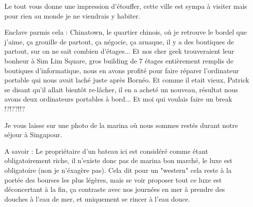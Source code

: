\begin{multicols}{2}
Le tout vous donne une impression d'étouffer, cette ville est sympa à visiter mais pour rien au monde je ne viendrais y habiter.

Enclave parmis cela : Chinatown, le quartier chinois, où je retrouve le bordel que j'aime, ça grouille de partout, ça négocie, ça arnaque, il y a des boutiques de partout, sur on ne sait combien d'étages... Et nos cher geek trouveraient leur bonheur à Sim Lim Square, gros building de 7 étages entièrement remplis de boutiques d'informatique, nous en avons profité pour faire réparer l'ordinateur portable qui nous avait laché juste après Bornéo. Et comme il etait vieux, Patrick se disant qu'il allait bientôt re-lâcher, il en a acheté un nouveau, résultat nous avons deux ordinateurs portables à bord... Et moi qui voulais faire un break !?!??!!?

Je vous laisse sur une photo de la marina où nous sommes restés durant notre séjour à Singapour.


A savoir : Le propriétaire d'un bateau ici est considéré comme étant obligatoirement riche, il n'existe donc pas de marina bon marché, le luxe est obligatoire (non je n'éxagère pas). Cela dit pour un "western" cela reste à la portée des bourses les plus légères, mais se voir proposer tout ce luxe est déconcertant à la fin, ça contraste avec nos journées en mer à prendre des douches à l'eau de mer, et uniquement se rincer à l'eau douce.

\end{multicols}


